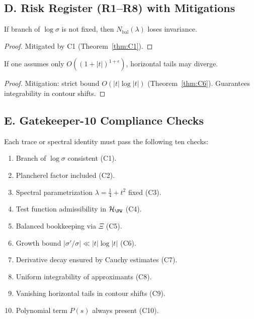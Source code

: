 
\subsection*{D. Risk Register (R1–R8) with Mitigations}

\begin{proposition}\label{prop:risk-R1}
If branch of $\log\sigma$ is not fixed, then $N_{\mathrm{bal}}(\lambda)$ loses invariance.
\end{proposition}

\begin{proof}
Mitigated by C1 (Theorem~\ref{thm:C1}).
\end{proof}

\begin{proposition}\label{prop:risk-R5}
If one assumes only $O((1+|t|)^{1+\epsilon})$, horizontal tails may diverge.
\end{proposition}

\begin{proof}
Mitigation: strict bound $O(|t|\log|t|)$ (Theorem~\ref{thm:C6}). Guarantees integrability in contour shifts.
\end{proof}


\subsection*{E. Gatekeeper-10 Compliance Checks}

\begin{definition}\label{def:gatekeeper-10}
Each trace or spectral identity must pass the following ten checks:
\begin{enumerate}[label=(\roman*)]
  \item Branch of $\log\sigma$ consistent (C1).
  \item Plancherel factor included (C2).
  \item Spectral parametrization $\lambda=\tfrac14+t^2$ fixed (C3).
  \item Test function admissibility in $\mathcal H_{\PW}$ (C4).
  \item Balanced bookkeeping via $\Xi$ (C5).
  \item Growth bound $|\sigma'/\sigma|\ll |t|\log|t|$ (C6).
  \item Derivative decay ensured by Cauchy estimates (C7).
  \item Uniform integrability of approximants (C8).
  \item Vanishing horizontal tails in contour shifts (C9).
  \item Polynomial term $P(s)$ always present (C10).
\end{enumerate}
\end{definition}

